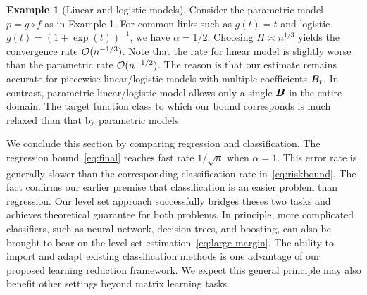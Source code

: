 \documentclass[11pt]{article}
\theoremstyle{definition}
\newtheorem{example}{Example}
\begin{document}
\begin{example}[Linear and logistic models]
Consider the parametric model $p=g\circ f$ as in Example 1. For common links such as $g(t)=t$ and logistic $g(t)=(1+\exp(t))^{-1}$, we have $\alpha=1/2$. Choosing $H\asymp n^{1/3}$ yields the convergence rate $\mathcal{O}(n^{-1/3})$.  Note that the rate for linear model is slightly worse than the parametric rate $\mathcal{O}(n^{-1/2})$. The reason is that our estimate remains accurate for piecewise linear/logistic models with multiple coefficients $\bm B_t$. In contrast, parametric linear/logistic model allows only a single $\bm B$ in the entire domain. The target function class to which our bound corresponds is much relaxed than that by parametric models. %
\end{example}

We conclude this section by comparing regression and classification. The regression bound~\eqref{eq:final} reaches fast rate $1/\sqrt{n}$ when $\alpha=1$. This error rate is generally slower than the corresponding classification rate in~\eqref{eq:riskbound}. The fact confirms our earlier premise that classification is an easier problem than regression. Our level set approach successfully bridges theses two tasks and achieves theoretical guarantee for both problems. In principle, more complicated classifiers, such as neural network, decision trees, and boosting, can also be brought to bear on the level set estimation~\eqref{eq:large-margin}. The ability to import and adapt existing classification methods is one advantage of our proposed learning reduction framework. We expect this general principle may also benefit other settings beyond matrix learning tasks.  
\end{document}

